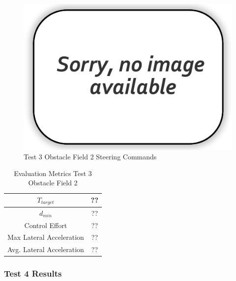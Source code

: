 \documentclass[12pt,twocolumn]{article}
\begin{document}
\begin{figure}
	\centering
	\includegraphics[width=\columnwidth]{Figs/no-image.png}
	\caption{\small Test 3 Obstacle Field 2 Steering Commands}  
	\label{fig:Test3_Obst2_Steer}
\end{figure}
\begin{table}
\begin{center}
	\begin{tabular}{||c |c||} 
		\hline
		$T_{target}$ & ??\\ 
		\hline
		$d_{min}$ & ??\\
		\hline
		Control Effort & ??\\
		\hline
		Max Lateral Acceleration & ??\\
		\hline
		Avg. Lateral Acceleration & ??\\
		\hline
	\end{tabular}
\end{center}
\caption{Evaluation Metrics Test 3 Obstacle Field 2}
\label{t:EvalTest3Obst2}
\end{table}


\subsubsection{Test 4 Results}\label{sss:Test4}
\end{document}
